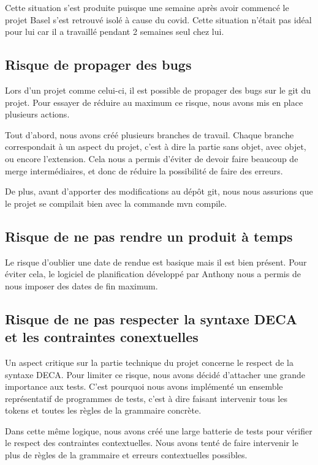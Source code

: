 \documentclass[12pt, a4paper, one side]{article}
\begin{document}
\begin{flushleft}
Cette situation s'est produite puisque une semaine après avoir commencé le projet Basel s'est retrouvé isolé à cause du covid. Cette situation n'était pas idéal pour lui car il a travaillé pendant 2 semaines seul chez lui.
\end{flushleft}

\subsection{Risque de propager des bugs}
Lors d'un projet comme celui-ci, il est possible de propager des bugs sur le git du projet. Pour essayer de réduire au maximum ce risque, nous avons mis en place plusieurs actions.

\begin{flushleft}
Tout d'abord, nous avons créé plusieurs branches de travail. Chaque branche correspondait à un aspect du projet, c'est à dire la partie sans objet, avec objet, ou encore l'extension. Cela nous a permis d'éviter de devoir faire beaucoup de merge intermédiaires, et donc de réduire la possibilité de faire des erreurs.
\end{flushleft}
\begin{flushleft}
De plus, avant d'apporter des modifications au dépôt git, nous nous assurions que le projet se compilait bien avec la commande mvn compile.
\end{flushleft}

\subsection{Risque de ne pas rendre un produit à temps}
\begin{flushleft}
Le risque d'oublier une date de rendue est basique mais il est bien présent. Pour éviter cela, le logiciel de planification développé par Anthony nous a permis de nous imposer des dates de fin maximum.
\end{flushleft}
\subsection{Risque de ne pas respecter la syntaxe DECA et les contraintes conextuelles}
\begin{flushleft}
Un aspect critique sur la partie technique du projet concerne le respect de la syntaxe DECA. Pour limiter ce risque, nous avons décidé d'attacher une grande importance aux tests. C'est pourquoi nous avons implémenté un ensemble représentatif de programmes de tests, c'est à dire faisant intervenir tous les tokens et toutes les règles de la grammaire concrète.
\end{flushleft}
\begin{flushleft}
Dans cette même logique, nous avons créé une large batterie de tests pour vérifier le respect des contraintes contextuelles. Nous avons tenté de faire intervenir le plus de règles de la grammaire et erreurs contextuelles possibles.
\end{flushleft}
\end{document}
